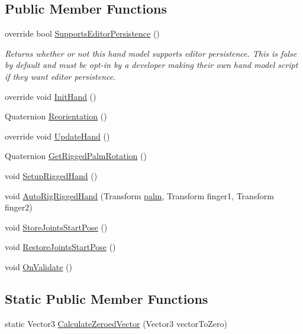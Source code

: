 \subsection*{Public Member Functions}
\begin{DoxyCompactItemize}
\item 
override bool \mbox{\hyperlink{class_leap_1_1_unity_1_1_rigged_hand_aa44bd1ae715125809d5803b293eb1bee}{Supports\+Editor\+Persistence}} ()
\begin{DoxyCompactList}\small\item\em Returns whether or not this hand model supports editor persistence. This is false by default and must be opt-\/in by a developer making their own hand model script if they want editor persistence. \end{DoxyCompactList}\item 
override void \mbox{\hyperlink{class_leap_1_1_unity_1_1_rigged_hand_a588b2f58a5ffbbfc451ddf8432228507}{Init\+Hand}} ()
\item 
Quaternion \mbox{\hyperlink{class_leap_1_1_unity_1_1_rigged_hand_aa4056b463cf5f441e96e1805a609cd6f}{Reorientation}} ()
\item 
override void \mbox{\hyperlink{class_leap_1_1_unity_1_1_rigged_hand_ac4e41fd3965e2d0d56379d3fc6011128}{Update\+Hand}} ()
\item 
Quaternion \mbox{\hyperlink{class_leap_1_1_unity_1_1_rigged_hand_aeeb6a629e804a4047ff01562cde17371}{Get\+Rigged\+Palm\+Rotation}} ()
\item 
void \mbox{\hyperlink{class_leap_1_1_unity_1_1_rigged_hand_a5a1c018bad50c06259998bdccbc2c513}{Setup\+Rigged\+Hand}} ()
\item 
void \mbox{\hyperlink{class_leap_1_1_unity_1_1_rigged_hand_a919b4e3b967a79eb3bcce6d838a7ef4c}{Auto\+Rig\+Rigged\+Hand}} (Transform \mbox{\hyperlink{class_leap_1_1_unity_1_1_hand_model_a9ed203915ef3ad91ea37b705c1fcffa1}{palm}}, Transform finger1, Transform finger2)
\item 
void \mbox{\hyperlink{class_leap_1_1_unity_1_1_rigged_hand_ae59cd89a5a3b39f56be3b8db74030fa5}{Store\+Joints\+Start\+Pose}} ()
\item 
void \mbox{\hyperlink{class_leap_1_1_unity_1_1_rigged_hand_aad0ba3eb19fbd881af90b7e5b6ffaf7d}{Restore\+Joints\+Start\+Pose}} ()
\item 
void \mbox{\hyperlink{class_leap_1_1_unity_1_1_rigged_hand_a375204e4916d600d49dcd6812d08f56e}{On\+Validate}} ()
\end{DoxyCompactItemize}
\subsection*{Static Public Member Functions}
\begin{DoxyCompactItemize}
\item 
static Vector3 \mbox{\hyperlink{class_leap_1_1_unity_1_1_rigged_hand_a67e0012de184ea7ea1e76cec5a21589b}{Calculate\+Zeroed\+Vector}} (Vector3 vector\+To\+Zero)
\end{DoxyCompactItemize}
